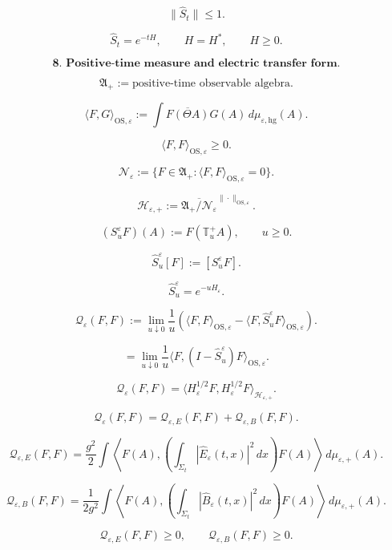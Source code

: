 \documentclass[11pt]{article}
\begin{document}
\[
\|\widehat S_t\|\le1.
\]

\[
\widehat S_t=e^{-tH},
\qquad
H=H^\ast,
\qquad
H\ge0.
\]

\bigskip

\[
\textbf{8. Positive-time measure and electric transfer form.}
\]

\[
\mathfrak A_+
:=
\text{positive-time observable algebra}.
\]

\[
\langle F,G\rangle_{\mathrm{OS},\varepsilon}
:=
\int
\overline{F(\Theta A)}G(A)
\,d\mu_{\varepsilon,\mathrm{hg}}(A).
\]

\[
\langle F,F\rangle_{\mathrm{OS},\varepsilon}\ge0.
\]

\[
\mathcal N_\varepsilon
:=
\{F\in\mathfrak A_+:
\langle F,F\rangle_{\mathrm{OS},\varepsilon}=0\}.
\]

\[
\mathcal H_{\varepsilon,+}
:=
\overline{\mathfrak A_+/\mathcal N_\varepsilon}^{\|\cdot\|_{\mathrm{OS},\varepsilon}}.
\]

\[
(S_u^\varepsilon F)(A)
:=
F(\mathbb T_u^+A),
\qquad
u\ge0.
\]

\[
\widehat S_u^\varepsilon[F]
:=
[S_u^\varepsilon F].
\]

\[
\widehat S_u^\varepsilon
=
e^{-uH_\varepsilon}.
\]

\[
\mathcal Q_\varepsilon(F,F)
:=
\lim_{u\downarrow0}
\frac{1}{u}
\left(
\langle F,F\rangle_{\mathrm{OS},\varepsilon}
-
\langle F,\widehat S_u^\varepsilon F\rangle_{\mathrm{OS},\varepsilon}
\right).
\]

\[
=
\lim_{u\downarrow0}
\frac{1}{u}
\langle F,(I-\widehat S_u^\varepsilon)F\rangle_{\mathrm{OS},\varepsilon}.
\]

\[
\mathcal Q_\varepsilon(F,F)
=
\langle H_\varepsilon^{1/2}F,H_\varepsilon^{1/2}F\rangle_{\mathcal H_{\varepsilon,+}}.
\]

\[
\mathcal Q_\varepsilon(F,F)
=
\mathcal Q_{\varepsilon,E}(F,F)
+
\mathcal Q_{\varepsilon,B}(F,F).
\]

\[
\mathcal Q_{\varepsilon,E}(F,F)
=
\frac{g^2}{2}
\int
\left\langle
F(A),
\left(
\int_{\Sigma_t}
|\widehat E_\varepsilon(t,x)|^2\,dx
\right)
F(A)
\right\rangle
\,d\mu_{\varepsilon,+}(A).
\]

\[
\mathcal Q_{\varepsilon,B}(F,F)
=
\frac{1}{2g^2}
\int
\left\langle
F(A),
\left(
\int_{\Sigma_t}
|\widehat B_\varepsilon(t,x)|^2\,dx
\right)
F(A)
\right\rangle
\,d\mu_{\varepsilon,+}(A).
\]

\[
\mathcal Q_{\varepsilon,E}(F,F)\ge0,
\qquad
\mathcal Q_{\varepsilon,B}(F,F)\ge0.
\]
\end{document}
